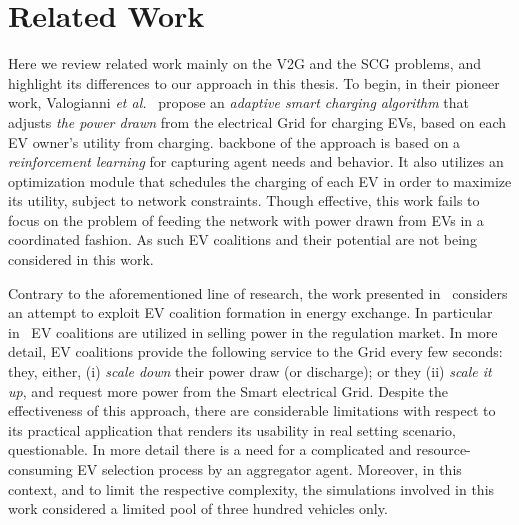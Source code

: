 
\chapter{Related Work} %

\label{Chapter5_related} %





Here we review related work mainly on the V2G and the SCG problems, and highlight its differences to our approach in this thesis.
To begin, in their pioneer work, Valogianni {\em et al.}~\cite{valogianni2014effective} propose an {\em adaptive smart charging algorithm} that adjusts {\em the power drawn} from the electrical Grid for charging EVs, based on each EV owner's utility from charging. backbone of the approach is based on a {\em reinforcement learning} for capturing agent needs and behavior. It also utilizes an optimization module that schedules the charging of each EV in order to maximize its utility, subject to network constraints. Though effective, this work fails to focus on the problem of feeding the network with power drawn from EVs in a coordinated fashion. As such EV coalitions and their potential are not being considered in this work.

Contrary to the aforementioned line of research, the work presented in~\cite{kamboj2010exploring} considers an attempt to exploit EV coalition formation in energy exchange. In particular in~\cite{kamboj2010exploring} EV coalitions are utilized in selling power in the regulation market. In more detail, EV coalitions provide the following service to the Grid every few seconds: they, either, (i) {\em scale down} their power draw (or discharge); or they (ii)  {\em scale it up}, and request more power from the Smart electrical Grid.
Despite the effectiveness of this approach, there are considerable limitations with respect to its practical application that renders its usability in real setting scenario, questionable. In more detail there is a need for a complicated and resource-consuming EV selection process by an aggregator agent. Moreover, in this context, and to limit the respective complexity, the simulations involved in this work considered a limited pool of three hundred vehicles only.

